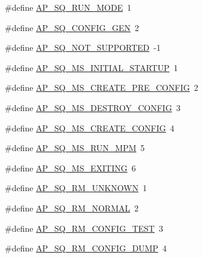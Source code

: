 \begin{DoxyCompactItemize}
\item 
\#define \hyperlink{group__APACHE__CORE__HTTPD_ga6197969483fa993b55a33378088e47dd}{A\+P\+\_\+\+S\+Q\+\_\+\+R\+U\+N\+\_\+\+M\+O\+DE}~1
\item 
\#define \hyperlink{group__APACHE__CORE__HTTPD_ga88095b04b6d548dd9633005c6a03be8b}{A\+P\+\_\+\+S\+Q\+\_\+\+C\+O\+N\+F\+I\+G\+\_\+\+G\+EN}~2
\item 
\#define \hyperlink{group__APACHE__CORE__HTTPD_ga0ac76d9f672617a4c6350d54467ffb0f}{A\+P\+\_\+\+S\+Q\+\_\+\+N\+O\+T\+\_\+\+S\+U\+P\+P\+O\+R\+T\+ED}~-\/1
\item 
\#define \hyperlink{group__APACHE__CORE__HTTPD_ga8df740793c13f142ae64723e6dba5854}{A\+P\+\_\+\+S\+Q\+\_\+\+M\+S\+\_\+\+I\+N\+I\+T\+I\+A\+L\+\_\+\+S\+T\+A\+R\+T\+UP}~1
\item 
\#define \hyperlink{group__APACHE__CORE__HTTPD_ga19f7cb0f29a648ae407a291d42d1f35b}{A\+P\+\_\+\+S\+Q\+\_\+\+M\+S\+\_\+\+C\+R\+E\+A\+T\+E\+\_\+\+P\+R\+E\+\_\+\+C\+O\+N\+F\+IG}~2
\item 
\#define \hyperlink{group__APACHE__CORE__HTTPD_ga9ea4414ae0c87457d4e009b7cddda36a}{A\+P\+\_\+\+S\+Q\+\_\+\+M\+S\+\_\+\+D\+E\+S\+T\+R\+O\+Y\+\_\+\+C\+O\+N\+F\+IG}~3
\item 
\#define \hyperlink{group__APACHE__CORE__HTTPD_ga43154cf04425f81cc9ed97e4e25d3f9c}{A\+P\+\_\+\+S\+Q\+\_\+\+M\+S\+\_\+\+C\+R\+E\+A\+T\+E\+\_\+\+C\+O\+N\+F\+IG}~4
\item 
\#define \hyperlink{group__APACHE__CORE__HTTPD_ga2f9f192dae36858bfad1a78775dd17f1}{A\+P\+\_\+\+S\+Q\+\_\+\+M\+S\+\_\+\+R\+U\+N\+\_\+\+M\+PM}~5
\item 
\#define \hyperlink{group__APACHE__CORE__HTTPD_ga778d9ad46c010a6e432b4900f16d682b}{A\+P\+\_\+\+S\+Q\+\_\+\+M\+S\+\_\+\+E\+X\+I\+T\+I\+NG}~6
\item 
\#define \hyperlink{group__APACHE__CORE__HTTPD_gaaaf96a9ade9932c291e30cb28ef4c0aa}{A\+P\+\_\+\+S\+Q\+\_\+\+R\+M\+\_\+\+U\+N\+K\+N\+O\+WN}~1
\item 
\#define \hyperlink{group__APACHE__CORE__HTTPD_ga59886acd6c44dcbd0a48dca833410805}{A\+P\+\_\+\+S\+Q\+\_\+\+R\+M\+\_\+\+N\+O\+R\+M\+AL}~2
\item 
\#define \hyperlink{group__APACHE__CORE__HTTPD_gab7264066cd1bc1d87044e618ca2bb11b}{A\+P\+\_\+\+S\+Q\+\_\+\+R\+M\+\_\+\+C\+O\+N\+F\+I\+G\+\_\+\+T\+E\+ST}~3
\item 
\#define \hyperlink{group__APACHE__CORE__HTTPD_ga0f9f4ecf42487f62311f7018fdeeffc1}{A\+P\+\_\+\+S\+Q\+\_\+\+R\+M\+\_\+\+C\+O\+N\+F\+I\+G\+\_\+\+D\+U\+MP}~4
\end{DoxyCompactItemize}
